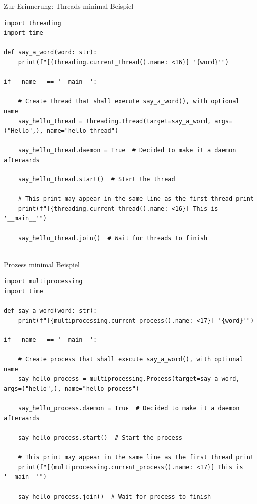 \documentclass[12pt, aspectratio=169, usepdftitle=false]{beamer}
\begin{document}
\begin{frame}[fragile]{Zur Erinnerung: Threads minimal Beispiel}
	\begin{lstlisting}[language=pytiny]
import threading
import time

def say_a_word(word: str):
    print(f"[{threading.current_thread().name: <16}] '{word}'")

if __name__ == '__main__':

    # Create thread that shall execute say_a_word(), with optional name
    say_hello_thread = threading.Thread(target=say_a_word, args=("Hello",), name="hello_thread")
    
    say_hello_thread.daemon = True  # Decided to make it a daemon afterwards

    say_hello_thread.start()  # Start the thread

    # This print may appear in the same line as the first thread print
    print(f"[{threading.current_thread().name: <16}] This is '__main__'")

    say_hello_thread.join()  # Wait for threads to finish
		
	\end{lstlisting}
\end{frame}


\begin{frame}[fragile]{Prozess minimal Beispiel}
	\begin{lstlisting}[language=pytiny]
import multiprocessing
import time

def say_a_word(word: str):
    print(f"[{multiprocessing.current_process().name: <17}] '{word}'")

if __name__ == '__main__':

    # Create process that shall execute say_a_word(), with optional name
    say_hello_process = multiprocessing.Process(target=say_a_word, args=("hello",), name="hello_process")
    
    say_hello_process.daemon = True  # Decided to make it a daemon afterwards

    say_hello_process.start()  # Start the process

    # This print may appear in the same line as the first thread print
    print(f"[{multiprocessing.current_process().name: <17}] This is '__main__'")

    say_hello_process.join()  # Wait for process to finish
		
	\end{lstlisting}
\end{frame}
\end{document}
